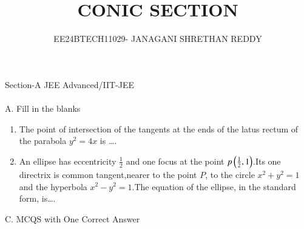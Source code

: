 \documentclass[journal,12pt,twocolumn]{IEEEtran}
\theoremstyle{remark}
\begin{document}
 


\vspace{3cm}

\title{CONIC SECTION}
\author{EE24BTECH11029- JANAGANI SHRETHAN REDDY}
\maketitle
\newpage
\bigskip
\renewcommand{\thefigure}{\theenumi}
\renewcommand{\thetable}{\theenumi}

{Section-A JEE Advanced/IIT-JEE}
\\\\{A. Fill in the blanks}
\begin{enumerate}
    \item The point of intersection of the tangents at the ends of the latus rectum of the parabola $y^2=4x$ is \ldots.
    \hfill{}\\
    \item An ellipse has eccentricity $\frac{1}{2}$ and one focus at the point $p\left(\frac{1}{2},1\right)$.Its one directrix is common tangent,nearer to the point $P$, to the circle $x^2+y^2=1$ and the hyperbola $x^2-y^2=1$.The equation of the ellipse, in the standard form, is\dots. \\
\end{enumerate}
{C. MCQS with One Correct Answer} 
\end{document}
